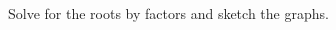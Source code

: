 \documentclass[12pt, a4paper, addpoints]{exam}
\begin{document}
\begin{questions}
\LARGE

\question Solve for the roots by factors  and sketch the graphs.

\setlength{\columnsep}{70pt}
\begin{multicols}{2}

\end{multicols}
\end{questions}
\end{document}
